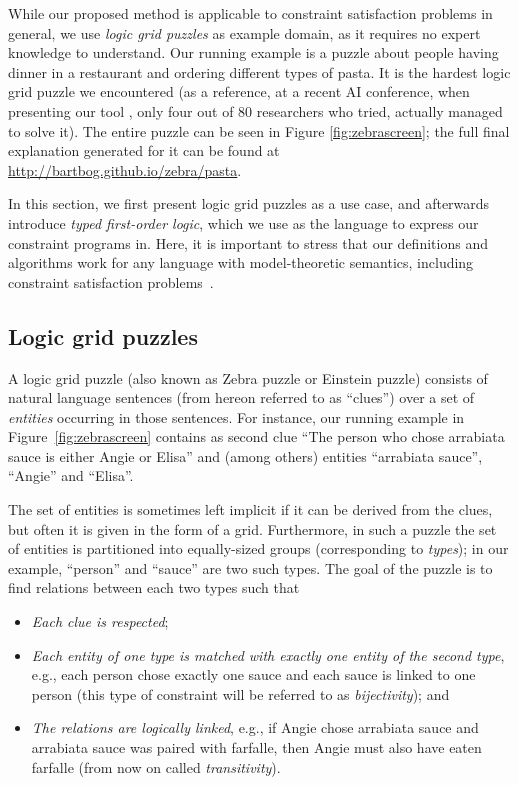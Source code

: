 While our proposed method is applicable to constraint satisfaction problems in general, we use \textit{logic grid puzzles} as example domain, as it requires no expert knowledge to understand.
Our running example is a puzzle about people having dinner in a restaurant and ordering different types of pasta. 
It is the hardest logic grid puzzle we encountered (as a reference, at a recent AI conference, when presenting our tool \cite{DBLP:conf/bnaic/ClaesBCGG19}, only four out of 80 researchers who tried, actually managed to solve it).    
The entire puzzle can be seen in Figure \ref{fig:zebrascreen}; the full final explanation generated for it can be found at \url{http://bartbog.github.io/zebra/pasta}.

In this section, we first present logic grid puzzles as a use case, and afterwards introduce \emph{typed first-order logic}, which we use as the language to express our constraint programs in. Here, it is important to stress that our definitions and algorithms work for any language with model-theoretic semantics, including constraint satisfaction problems~\cite{rossi2006handbook}.


\subsection{Logic grid puzzles}
A logic grid puzzle (also known as Zebra puzzle or Einstein puzzle) consists of natural language sentences (from hereon referred to as ``clues'') over a set of \emph{entities} occurring in those sentences. 
For instance, our running example in Figure~\ref{fig:zebrascreen} contains as second clue ``The person who chose arrabiata sauce is either Angie or Elisa'' and (among others) entities ``arrabiata sauce'', ``Angie'' and ``Elisa''. 

The set of entities is sometimes left implicit if it can be derived from the clues, but often it is given in the form of a grid. 
Furthermore, in such a puzzle the set of entities is partitioned into equally-sized groups (corresponding to \emph{types}); in our example, ``person'' and ``sauce'' are two such types. 
% 
The goal of the puzzle is to find relations between each two types such that
\begin{itemize}
	\item \textit{Each clue is respected}; 
	\item \textit{Each entity of one type is matched with exactly one entity of the second type}, e.g., each person chose exactly one sauce and each sauce is linked to one person (this type of constraint will be referred to as \emph{bijectivity}); and 
	\item \textit{The relations are logically linked}, e.g., if Angie chose arrabiata sauce and arrabiata sauce was paired with farfalle, then Angie must also have eaten farfalle (from now on called \emph{transitivity}). 
\end{itemize}


